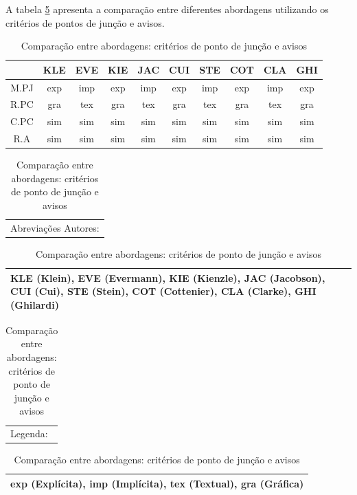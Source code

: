 A tabela \ref{tab:comparison_table_join_points_advices} apresenta a comparação entre diferentes abordagens utilizando os critérios de pontos de
junção e avisos.

\begin{table}[h]
	\centering
	\begin{tabular}{ | c | c | c | c | c | c | c | c | c | c | }
		\hline
		 & KLE & EVE & KIE & JAC & CUI & STE & COT & CLA & GHI \\
		\hline
		 M.PJ & exp & imp & exp & imp & exp & imp & exp & imp & exp  \\
		\hline
		 R.PC & gra & tex & gra & tex & gra & tex & gra & tex & gra \\
		\hline
		 C.PC & sim & sim & sim & sim & sim & sim & sim & sim & sim \\
		\hline
		 R.A & sim & sim & sim & sim & sim & sim & sim & sim & sim \\
		\hline
	\end{tabular}
	
	\hspace{2em}
	
	\begin{tabular}{  p{11cm}  }
		Abreviações Autores: \\
	\end{tabular}
	
	\begin{tabular}{ | p{11cm} | }
		\hline
		KLE (Klein), EVE (Evermann), KIE (Kienzle), JAC (Jacobson), CUI (Cui), STE (Stein), COT (Cottenier), CLA (Clarke), GHI (Ghilardi) \\
		\hline
	\end{tabular}
	
	\begin{tabular}{  p{11cm}  }
		Legenda: \\
	\end{tabular}

	\begin{tabular}{ | p{11cm} | }
		\hline
		exp (Explícita), imp (Implícita), tex (Textual), gra (Gráfica)  \\
		\hline
	\end{tabular}
	\caption{Comparação entre abordagens: critérios de ponto de junção e avisos}
	\label{tab:comparison_table_join_points_advices}
\end{table} 

